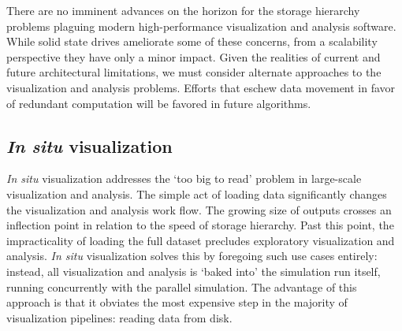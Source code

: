 

There are no imminent advances on the horizon for the storage hierarchy
problems plaguing modern high-performance visualization and analysis
software.  While solid state drives ameliorate some of these concerns,
from a scalability perspective they have only a minor impact.  Given
the realities of current and future architectural limitations, we
must consider alternate approaches to the visualization and analysis
problems.  Efforts that eschew data movement in favor of redundant
computation will be favored in future algorithms.


\subsection{\textit{In situ} visualization}

\textit{In situ} visualization addresses the `too big to read' problem
in large-scale visualization and analysis.  The simple act of loading
data significantly changes the visualization and analysis work flow.
The growing size of outputs crosses an inflection point in relation to
the speed of storage hierarchy.  Past this point, the impracticality of
loading the full
dataset precludes exploratory visualization and analysis. \textit{In
situ} visualization solves this by foregoing such use cases entirely:
instead, all visualization and analysis is `baked into' the simulation
run itself, running concurrently with the parallel simulation.  The
advantage of this approach is that it obviates the most expensive step
in the majority of visualization pipelines: reading data from disk.


